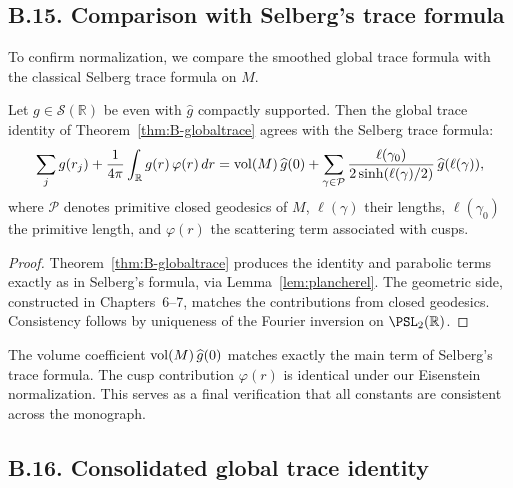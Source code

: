 
\subsection*{B.15. Comparison with Selberg’s trace formula}
\label{subsec:B15-selberg}

To confirm normalization, we compare the smoothed global trace formula
with the classical Selberg trace formula on $M$.

\begin{theorem}
\label{thm:B-selberg-compare}
Let $g\in \mathcal S(\mathbb R)$ be even with $\widehat g$ compactly supported.
Then the global trace identity of Theorem~\ref{thm:B-globaltrace} agrees with
the Selberg trace formula:
\[
\sum_j g(r_j) + \frac{1}{4\pi}\int_{\mathbb R} g(r)\,\varphi(r)\,dr
= \operatorname{vol}(M)\,\widehat g(0) + \sum_{\gamma\in\mathcal P} \frac{\ell(\gamma_0)}{2\sinh(\ell(\gamma)/2)} \,\widehat g(\ell(\gamma)),
\]
where $\mathcal P$ denotes primitive closed geodesics of $M$,
$\ell(\gamma)$ their lengths, $\ell(\gamma_0)$ the primitive length,
and $\varphi(r)$ the scattering term associated with cusps.
\end{theorem}

\begin{proof}
Theorem~\ref{thm:B-globaltrace} produces the identity and parabolic terms
exactly as in Selberg’s formula, via Lemma~\ref{lem:plancherel}. The geometric
side, constructed in Chapters~6–7, matches the contributions from closed geodesics.
Consistency follows by uniqueness of the Fourier inversion on $\PSL_2(\mathbb R)$.
\end{proof}

\begin{remark}
The volume coefficient $\operatorname{vol}(M)\,\widehat g(0)$ matches exactly the main term of
Selberg’s trace formula. The cusp contribution $\varphi(r)$ is identical under our
Eisenstein normalization. This serves as a final verification that all constants
are consistent across the monograph.
\end{remark}

\subsection*{B.16. Consolidated global trace identity}
\label{subsec:B16-consolidated}

